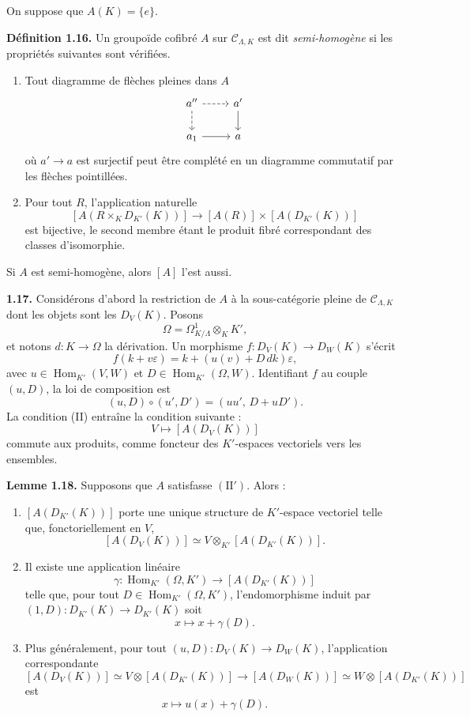 \documentclass[11pt]{article}
\providecommand{\Hom}{\operatorname{Hom}}
\begin{document}
On suppose que \(A(K)=\{e\}\).

\textbf{D\'efinition 1.16.} Un groupo\"ide cofibr\'e \(A\) sur \(\mathcal C_{\Lambda,K}\)
est dit \emph{semi-homog\`ene} si les propri\'et\'es suivantes sont v\'erifi\'ees.

\begin{enumerate}[label=(\Roman*)]
\item Tout diagramme de fl\`eches pleines dans \(A\)
\[
\begin{tikzcd}
a'' \arrow[r,dashed] \arrow[d,dashed] & a' \arrow[d]\\
a_1 \arrow[r] & a
\end{tikzcd}
\]
o\`u \(a'\to a\) est surjectif peut \^etre compl\'et\'e en un diagramme commutatif
par les fl\`eches pointill\'ees.

\item Pour tout \(R\), l'application naturelle
\[
 [A(R\times_K D_{K'}(K))]
 \longrightarrow
 [A(R)]\times [A(D_{K'}(K))]
\]
est bijective, le second membre \'etant le produit fibr\'e correspondant des classes
d'isomorphie.
\end{enumerate}
Si \(A\) est semi-homog\`ene, alors \([A]\) l'est aussi.

\textbf{1.17.} Consid\'erons d'abord la restriction de \(A\) \`a la sous-cat\'egorie pleine
de \(\mathcal C_{\Lambda,K}\) dont les objets sont les \(D_V(K)\). Posons
\[
 \Omega=\Omega^1_{K/\Lambda}\otimes_K K',
\]
et notons \(d:K\to\Omega\) la d\'erivation. Un morphisme
\(f:D_V(K)\to D_W(K)\) s'\'ecrit
\[
 f(k+v\varepsilon)=k+(u(v)+D\,dk)\varepsilon,
\]
avec \(u\in\Hom_{K'}(V,W)\) et \(D\in\Hom_{K'}(\Omega,W)\). Identifiant \(f\)
au couple \((u,D)\), la loi de composition est
\[
 (u,D)\circ(u',D')=(uu',\,D+uD').
\]
La condition (II) entra\^ine la condition suivante :
\[
\tag{II'}
 V\longmapsto [A(D_V(K))]
\]
commute aux produits, comme foncteur des \(K'\)-espaces vectoriels vers les ensembles.

\textbf{Lemme 1.18.} Supposons que \(A\) satisfasse \((\mathrm{II}')\). Alors :

\begin{enumerate}[label=(\arabic*)]
\item \([A(D_{K'}(K))]\) porte une unique structure de \(K'\)-espace vectoriel telle que,
fonctoriellement en \(V\),
\[
 [A(D_V(K))]\simeq V\otimes_{K'}[A(D_{K'}(K))].
\]
\item Il existe une application lin\'eaire
\[
 \gamma:\Hom_{K'}(\Omega,K')\longrightarrow [A(D_{K'}(K))]
\]
telle que, pour tout \(D\in\Hom_{K'}(\Omega,K')\), l'endomorphisme induit par
\((1,D):D_{K'}(K)\to D_{K'}(K)\) soit
\[
 x\longmapsto x+\gamma(D).
\]
\item Plus g\'en\'eralement, pour tout \((u,D):D_V(K)\to D_W(K)\), l'application correspondante
\[
 [A(D_V(K))]\simeq V\otimes[A(D_{K'}(K))]
 \longrightarrow
 [A(D_W(K))]\simeq W\otimes[A(D_{K'}(K))]
\]
est
\[
 x\longmapsto u(x)+\gamma(D).
\]
\end{enumerate}
\end{document}

